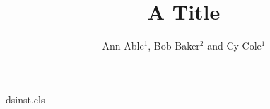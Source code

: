 \begin{filecontents*}[overwrite]{dsinst.cls}
\newcommand{\institute}[1]{\gdef\ds@inst{{\itshape #1}}}
\let\ds@inst\empty
\def\@maketitle{\begin{center}{\LARGE\@title\par}\vskip1em{\large\@author\par}\vskip1em
  {\small\ds@inst\par}\end{center}}
\end{filecontents*}
\documentclass{dsinst}

\title{A Title}
\author{Ann Able$^{1}$, Bob Baker$^{2}$ and Cy Cole$^{1}$}
\maketitle
Text.

